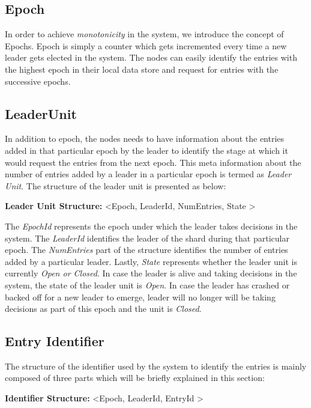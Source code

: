 \documentclass[a4paper,11pt]{kth-mag}
\begin{document}
\subsection{Epoch}

In order to achieve \textit{monotonicity} in the system, we introduce the concept of Epochs. Epoch is simply a counter which gets incremented every time a new leader gets elected in the system. The nodes can easily identify the entries with the highest epoch in their local data store and request for entries with the successive epochs. 

\subsection{LeaderUnit}
In addition to epoch, the nodes needs to have information about the entries added in that particular epoch by the leader to identify the stage at which it would request the entries from the next epoch. This meta information about the number of entries added by a leader in a particular epoch is termed as \textit{Leader Unit}. The structure of the leader unit is presented as below:

\begin{tcolorbox}
\textbf{Leader Unit Structure:} \textless Epoch, LeaderId, NumEntries, State \textgreater
\end{tcolorbox}

The \textit{EpochId} represents the epoch under which the leader takes decisions in the system. The \textit{LeaderId} identifies the leader of the shard during that particular epoch. The \textit{NumEntries} part of the structure identifies the number of entries added by a particular leader. Lastly, \textit{State} represents whether the leader unit is currently \textit{Open or Closed}. In case the leader is alive and taking decisions in the system, the state of the leader unit is \textit{Open}. In case the leader has crashed or backed off for a new leader to emerge, leader will no longer will be taking decisions as part of this epoch and the unit is \textit{Closed}.


\subsection{Entry Identifier}

The structure of the identifier used by the system to identify the entries is mainly composed of three parts which will be briefly explained in this section:

\begin{tcolorbox}
\textbf{Identifier Structure:} \textless Epoch, LeaderId, EntryId \textgreater
\end{tcolorbox}
\end{document}
